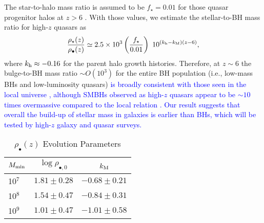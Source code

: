 \documentclass[twocolumn, twocolappendix]{aastex63}
\newcommand{\Mh}{M_\mathrm{h}}
\newcommand{\D}{\mathrm{d}}
\newcommand{\red}[1]{\textcolor{red}{ #1}}
\newcommand{\blue}[1]{\textcolor{blue}{ #1}}
\begin{document}
\begin{CJK*}{UTF8}{gbsn}
The star-to-halo mass ratio is assumed to be $f_\star =0.01$ for those quasar progenitor halos at $z>6$
\citep[fits by code {\tt UNIVERSEMACHINE} in][]{2019MNRAS.488.3143B}.
With those values, we estimate the stellar-to-BH mass ratio for high-$z$ quasars as
%
\begin{equation}
\frac{\rho_{\star}(z)}{\rho_{\bullet}(z)}
\simeq 2.5\times 10^{3} \left(\frac{f_\star}{0.01}\right)
~ 10^{(k_{\rm h}-k_{\rm M})(z-6)},
\end{equation}
% 
where $k_{\rm h} \approx -0.16 $ for the parent halo growth histories.
Therefore, at $z\sim 6$ the bulge-to-BH mass ratio $\sim O(10^3)$ for the entire BH population (i.e., low-mass BHs and low-luminosity quasars) 
\blue{
is broadly consistent with those seen in the local universe \citep[$\simeq 200-1000$ in e.g.,][]{2012ApJ...751L..25V,2013ARA&A..51..511K},
although SMBHs observed as high-$z$ quasars appear to be $\sim 10$ times overmassive compared to the local relation 
\citep[e.g.,][]{2013ApJ...773...44W,2020A&A...637A..84P,2021ApJ...911..141N}.
Our result suggests that overall the build-up of stellar mass in galaxies is earlier than BHs,
which will be tested by high-$z$ galaxy and quasar surveys.
}

\begin{table}
\renewcommand\thetable{1} %
\caption{$\rho_\bullet(z)$ Evolution Parameters}
\begin{center}
\begin{tabular}{l c r}
\hline
\hline
$M_{\rm min}$ & $\log \rho_{\bullet,0}$ & $k_{\rm M}$ ~~~ \\ 
\hline 
10$^7$  &  $ 1.81\pm 0.28$  &  $-0.68 \pm 0.21$  \\
10$^8$  &  $ 1.54\pm 0.47$  &  $-0.84 \pm 0.31$  \\
10$^9$  &  $ 1.01\pm 0.47$  &  $-1.01 \pm 0.58$ \\
\hline 
\end{tabular}
\label{tab:MFz}
\end{center}
\end{table}    
\fi



\end{CJK*}
\end{document}
